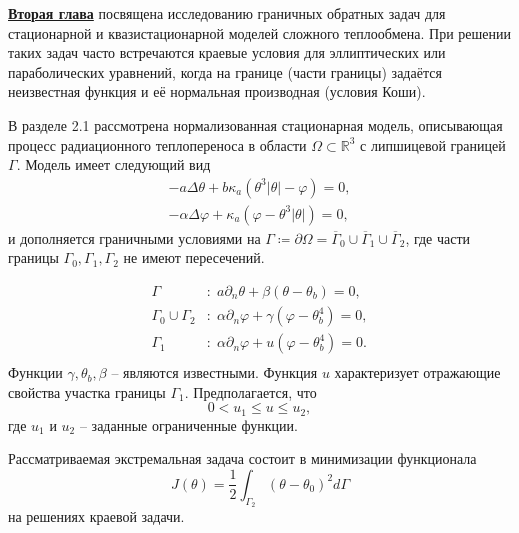 \underline{\textbf{Вторая глава}} посвящена исследованию граничных обратных задач для
стационарной и квазистационарной моделей сложного теплообмена.
При решении таких задач часто встречаются краевые условия для
эллиптических или параболических уравнений,
когда на границе (части границы) задаётся неизвестная функция
и её нормальная производная (условия Коши).


В разделе 2.1 рассмотрена нормализованная стационарная модель,
описывающая процесс радиационного теплопереноса в
области $\Omega \subset \mathbb{R}^3$ с липшицевой границей $\Gamma$.
Модель имеет следующий вид
\begin{equation}
    \label{eq:2_1:initial}
    \begin{aligned}
        - a \Delta \theta + b \kappa_a(\theta ^ 3 | \theta | - \varphi) = 0,  \\
        - \alpha \Delta \varphi + \kappa_a (\varphi - \theta ^3 | \theta |) = 0,
    \end{aligned}
\end{equation}
и дополняется граничными условиями на
$\Gamma \coloneqq \partial \Omega =\overline{\Gamma}_0 \cup \overline{\Gamma}_1 \cup \overline{\Gamma}_2$,
где части границы $\Gamma_0, \Gamma_1, \Gamma_2$ не имеют пересечений.

\begin{equation}
    \label{eq:2_1:initial-boundary}
    \begin{aligned}
        \Gamma &: \; a \partial_n \theta + \beta (\theta - \theta _b) = 0, \\
        \Gamma_0 \cup \Gamma_2 &: \; \alpha \partial_n \varphi
        + \gamma(\varphi - \theta_b ^4 ) = 0, \\
        \Gamma_1 &: \; \alpha \partial_n \varphi + u(\varphi - \theta_b ^4 ) = 0. \\
    \end{aligned}
\end{equation}
Функции $\gamma, \theta_b, \beta$ -- являются известными.
Функция $u$ характеризует отражающие свойства участка границы $\Gamma_1$.
Предполагается, что
\begin{equation}
    \label{eq:2_1:control_bounds}
    0 < u_1 \leq u \leq u_2,
\end{equation}
где $u_1$ и $u_2$ -- заданные ограниченные функции.

Рассматриваемая экстремальная задача состоит в минимизации функционала
\begin{equation}
    \label{eq:2_1:quality}
    J(\theta) = \frac{1}{2} \int_{\Gamma_2} (\theta - \theta_0)^2 d\Gamma
\end{equation}
на решениях краевой задачи.


